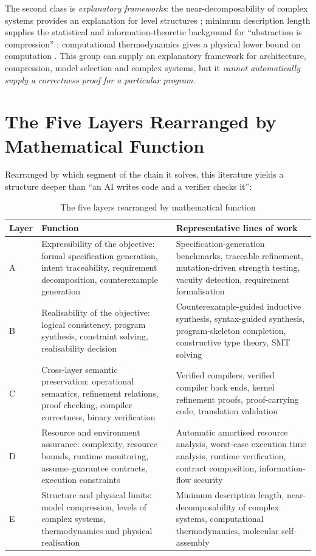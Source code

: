 The second class is \emph{explanatory frameworks}: the near-decomposability of complex
systems provides an explanation for level structures \cite{simon1962}; minimum description
length supplies the statistical and information-theoretic background for ``abstraction is
compression'' \cite{rissanen1978,grunwald2006,grunwald2019}; computational thermodynamics
gives a physical lower bound on computation \cite{landauer1961}. This group can supply an
explanatory framework for architecture, compression, model selection and complex systems,
but it \emph{cannot automatically supply a correctness proof for a particular program}.

\section{The Five Layers Rearranged by Mathematical Function}\label{sec:five-layers}

Rearranged by which segment of the chain it solves, this literature yields a structure
deeper than ``an AI writes code and a verifier checks it'':

\begin{table}[htbp]
\centering
\small
\caption{The five layers rearranged by mathematical function}\label{tab:five-layers}
\begin{tabular}{L{1.6cm}L{5.4cm}L{7.2cm}}
\toprule
\textbf{Layer} & \textbf{Function} & \textbf{Representative lines of work} \\
\midrule
A & Expressibility of the objective: formal specification generation, intent traceability,
  requirement decomposition, counterexample generation &
  Specification-generation benchmarks, traceable refinement, mutation-driven strength
  testing, vacuity detection, requirement formalisation \\
B & Realisability of the objective: logical consistency, program synthesis, constraint
  solving, realisability decision &
  Counterexample-guided inductive synthesis, syntax-guided synthesis, program-skeleton
  completion, constructive type theory, SMT solving \\
C & Cross-layer semantic preservation: operational semantics, refinement relations, proof
  checking, compiler correctness, binary verification &
  Verified compilers, verified compiler back ends, kernel refinement proofs, proof-carrying
  code, translation validation \\
D & Resource and environment assurance: complexity, resource bounds, runtime monitoring,
  assume--guarantee contracts, execution constraints &
  Automatic amortised resource analysis, worst-case execution time analysis, runtime
  verification, contract composition, information-flow security \\
E & Structure and physical limits: model compression, levels of complex systems,
  thermodynamics and physical realisation &
  Minimum description length, near-decomposability of complex systems, computational
  thermodynamics, molecular self-assembly \\
\bottomrule
\end{tabular}
\end{table}

